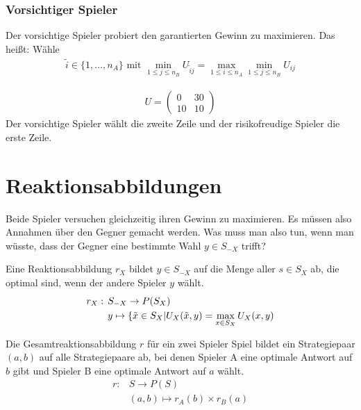 \subsubsection{Vorsichtiger Spieler}
Der vorsichtige Spieler probiert den garantierten Gewinn zu maximieren. Das heißt: Wähle 
\begin{align*}
	\tilde{i} \in \{1, \dots, n_A  \} \text{ mit } \min\limits_{1 \leq j \leq n_B} U_{\tilde{i}j}=\max\limits_{1 \leq i \leq n_A} \min\limits_{1 \leq j \leq n_B} U_{ij}
\end{align*} 

\begin{bsp}[Regenschirm?]
	\begin{align*} U=
		\begin{pmatrix}
			0 & 30 \\ 10 & 10
		\end{pmatrix}
	\end{align*}
	Der vorsichtige Spieler wählt die zweite Zeile und der risikofreudige Spieler die erste Zeile. 
\end{bsp}

\section{Reaktionsabbildungen}
Beide Spieler versuchen gleichzeitig ihren Gewinn zu maximieren. Es müssen also Annahmen über den Gegner gemacht werden. Was muss man also tun, wenn man wüsste, dass der Gegner eine bestimmte Wahl $y \in S_{-X}$ trifft? 

\begin{defi}[Reaktionsabbildung]
	Eine Reaktionsabbildung $r_X$ bildet $y \in S_{-X}$  auf die Menge aller $s \in S_X$ ab, die optimal sind, wenn der andere Spieler $y$ wählt.
	\begin{align*}
		 r_X:\hspace{1ex}&  S_{-X} \rightarrow P(S_X) \\
		& y \mapsto \{\tilde{x} \in S_X | U_X(\tilde{x},y)=\max\limits_{x \in S_X} U_X(x,y)
	\end{align*}
\end{defi}

\begin{defi}[Gesamtreaktionsabbildung]
	Die Gesamtreaktionsabbildung $r$ für ein zwei Spieler Spiel bildet ein Strategiepaar $(a,b)$ auf alle Strategiepaare ab, bei denen Spieler A eine optimale Antwort auf $b$ gibt und Spieler B eine optimale Antwort auf $a$ wählt. 
	\begin{align*}
		r:  & S \rightarrow P(S) \\
			& (a,b) \mapsto r_A(b) \times r_B(a) 
	\end{align*} 
\end{defi}




